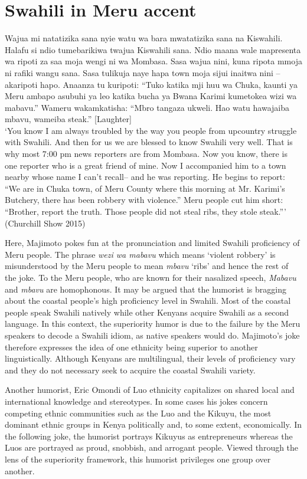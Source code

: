 \documentclass[output=paper]{langsci/langscibook}
\begin{document}
\chapter{Swahili in Meru accent}
\gll Wajua mi natatizika sana nyie watu wa bara mwatatizika sana na Kiswahili. Halafu si ndio tumebarikiwa twajua Kiswahili sana. Ndio maana wale mapresenta wa ripoti za saa moja wengi ni wa Mombasa. Sasa wajua nini, kuna ripota mmoja ni rafiki wangu sana. Sasa tulikuja naye hapa town moja sijui inaitwa nini – akaripoti hapo. Anaanza tu kuripoti: “Tuko katika mji huu wa Chuka, kaunti ya Meru ambapo asubuhi ya leo katika bucha ya Bwana Karimi kumetokea wizi wa mabavu.” Wameru wakamkatisha: “Mbro tangaza ukweli. Hao watu hawajaiba mbavu, wameiba steak.” \textup{[Laughter]} \\
\glt ‘You know I am always troubled by the way you people from upcountry struggle with Swahili. And then for us we are blessed to know Swahili very well. That is why most 7:00 pm news reporters are from Mombasa. Now you know, there is one reporter who is a great friend of mine. Now I accompanied him to a town nearby whose name I can’t recall– and he was reporting. He begins to report: “We are in Chuka town, of Meru County where this morning at Mr. Karimi’s Butchery, there has been robbery with violence.” Meru people cut him short: “Brother, report the truth. Those people did not steal ribs, they stole steak.”’ (Churchill Show 2015)
\z

Here, Majimoto pokes fun at the pronunciation and limited Swahili proficiency of Meru people. The phrase \textit{wezi wa mabavu} which means ‘violent robbery’ is misunderstood by the Meru people to mean \textit{mbavu} ‘ribs’ and hence the rest of the joke. To the Meru people, who are known for their nasalized speech, \textit{Mabavu} and \textit{mbavu} are homophonous. It may be argued that the humorist is bragging about the coastal people’s high proficiency level in Swahili. Most of the coastal people speak Swahili natively while other Kenyans acquire Swahili as a second language. In this context, the superiority humor is due to the failure by the Meru speakers to decode a Swahili idiom, as native speakers would do. Majimoto’s joke therefore expresses the idea of one ethnicity being superior to another linguistically. Although Kenyans are multilingual, their levels of proficiency vary and they do not necessary seek to acquire the coastal Swahili variety.

Another humorist, Eric Omondi of Luo ethnicity capitalizes on shared local and international knowledge and stereotypes. In some cases his jokes concern competing ethnic communities such as the Luo and the Kikuyu, the most dominant ethnic groups in Kenya politically and, to some extent, economically. In the following joke, the humorist portrays Kikuyus as entrepreneurs whereas the Luos are portrayed as proud, snobbish, and arrogant people. Viewed through the lens of the superiority framework, this humorist privileges one group over another. 
\end{document}

